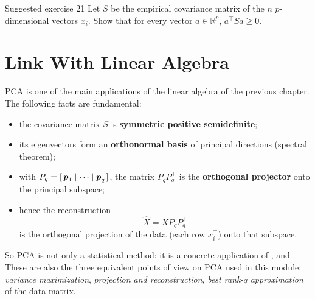 

\begin{Exercise}{Suggested exercise 21}{}
  Let $S$ be the empirical covariance matrix of the $n$ $p$-dimensional vectors $x_i$. Show that for every
  vector $a \in \mathbb{R}^p$, $a^\top S a \geq 0$.
\end{Exercise}


\section{Link With Linear Algebra}

PCA is one of the main applications of the linear algebra of the previous chapter. The following facts are
fundamental:
\begin{itemize}
  \item the covariance matrix $S$ is \textbf{symmetric positive semidefinite};
  \item its eigenvectors form an \textbf{orthonormal basis} of principal directions (spectral theorem);
  \item with $P_q = [\,\boldsymbol{p}_1 \mid \cdots \mid \boldsymbol{p}_q\,]$, the matrix $P_q P_q^\top$ is the
        \textbf{orthogonal projector} onto the principal subspace;
  \item hence the reconstruction
        \[
          \hat{X} = X P_q P_q^\top
        \]
        is the orthogonal projection of the data (each row $x_i^\top$) onto that subspace.
\end{itemize}
So PCA is not only a statistical method: it is a concrete application of ,
 and . These are also the three equivalent points
of view on PCA used in this module: \emph{variance maximization}, \emph{projection and reconstruction},
\emph{best rank-$q$ approximation} of the data matrix.

